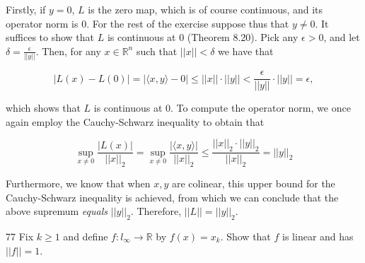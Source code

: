 \begin{solution}
    
    Firstly, if $y = 0$, $L$ is the zero map, which is of course continuous, and its operator norm is 0.
    For the rest of the exercise suppose thus that $y \neq 0$.
    It suffices to show that $L$ is continuous at 0 (Theorem 8.20).
    Pick any $\epsilon > 0$, and let $\delta = \frac{\epsilon}{\lvert \lvert y \rvert \rvert}$.
    Then, for any $x \in \mathbb{R}^n$ such that $\lvert \lvert x \rvert \rvert < \delta$ we have that

    \[\lvert L(x) - L(0) \rvert = \lvert \langle x, y \rangle - 0 \rvert \leq \lvert \lvert x \rvert \rvert \cdot \lvert \lvert y \rvert \rvert < \frac{\epsilon}{\lvert \lvert y \rvert \rvert} \cdot \lvert \lvert y \rvert \rvert = \epsilon,\]

    which shows that $L$ is continuous at 0.
    To compute the operator norm, we once again employ the Cauchy-Schwarz inequality to obtain that

    \[\sup_{x \neq 0} \frac{\lvert L(x) \rvert}{\lvert \lvert x \rvert \rvert_2} = \sup_{x \neq 0} \frac{\lvert \langle x, y \rangle \rvert}{\lvert \lvert x \rvert \rvert_2} \leq \frac{\lvert \lvert x \rvert \rvert_2 \cdot \lvert \lvert y \rvert \rvert_2}{\lvert \lvert x \rvert \rvert_2} = \lvert \lvert y \rvert \rvert_2\]

    Furthermore, we know that when $x, y$ are colinear, this upper bound for the Cauchy-Schwarz inequality is achieved, from which we can conclude that the above supremum \textit{equals} $\lvert \lvert y \rvert \rvert_2$.
    Therefore, $\lvert \lvert L \rvert \rvert = \lvert \lvert y \rvert \rvert_2$.

\end{solution}

\begin{exercise}{77}
    Fix $k \geq 1$ and define $f: l_{\infty} \rightarrow \mathbb{R}$ by $f(x) = x_k$.
    Show that $f$ is linear and has $\lvert \lvert f \rvert \rvert = 1$.
\end{exercise}

